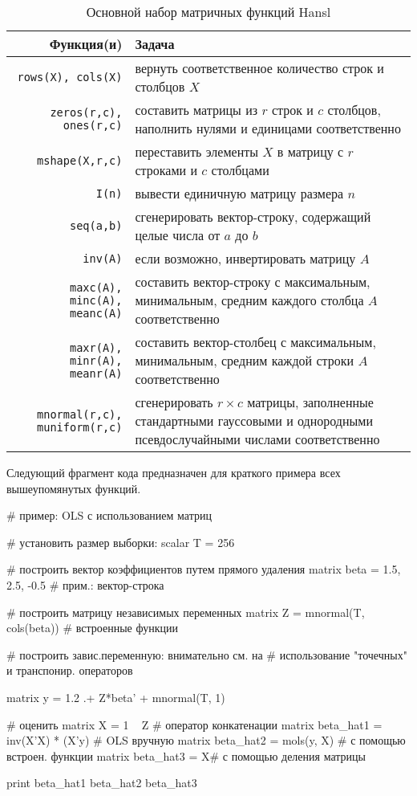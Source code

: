 \begin{table}[htbp]
  \centering
  \small
  \begin{tabular}{rp{}}
    \textbf{Функция(и)} & \textbf{Задача} \\
    \hline
    \texttt{rows(X), cols(X)} & вернуть  соответственное  количество строк и столбцов $X$ \\
    \texttt{zeros(r,c), ones(r,c)} & составить матрицы из $r$ строк и $c$ столбцов, наполнить нулями и единицами соответственно \\
    \texttt{mshape(X,r,c)} & переставить элементы $X$ в
    матрицу с $r$ строками и $c$ столбцами \\
    \texttt{I(n)} & вывести единичную матрицу размера $n$ \\
    \texttt{seq(a,b)} & сгенерировать вектор-строку, содержащий целые числа от $a$ до $b$ \\
    \texttt{inv(A)} & если возможно, инвертировать матрицу $A$ \\
    \texttt{maxc(A), minc(A), meanc(A)} & составить вектор-строку с максимальным, минимальным, средним каждого столбца $A$ соответственно   \\
    \texttt{maxr(A), minr(A), meanr(A)} & составить вектор-столбец с максимальным, минимальным, средним каждой строки $A$ соответственно \\
    \texttt{mnormal(r,c), muniform(r,c)} & сгенерировать $r \times c$   матрицы, заполненные стандартными гауссовыми и однородными псевдослучайными
  числами соответственно \\
    \hline
  \end{tabular}
  \caption{Основной набор матричных функций Hansl}
  \label{tab:essential-matfuncs}
\end{table}

Следующий фрагмент кода предназначен для краткого примера всех
вышеупомянутых функций.

\begin{code}
# пример: OLS с использованием матриц

# установить размер выборки:
scalar T = 256

# построить вектор коэффициентов путем прямого удаления 
matrix beta = {1.5, 2.5, -0.5} # прим.: вектор-строка

# построить матрицу независимых переменных
matrix Z = mnormal(T, cols(beta)) # встроенные функции

# построить завис.переменную: внимательно см. на
# использование "точечных" и транспонир. операторов

matrix y = {1.2} .+ Z*beta' + mnormal(T, 1)

# оценить
matrix X = 1 ~ Z  # оператор конкатенации
matrix beta_hat1 = inv(X'X) * (X'y) # OLS вручную
matrix beta_hat2 = mols(y, X)       # с помощью встроен. функции
matrix beta_hat3 = X\y              # с помощью деления матрицы

print beta_hat1 beta_hat2 beta_hat3
\end{code}


